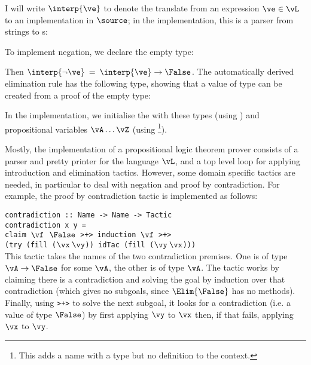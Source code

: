 I will write $\interp{\ve}$ to denote the translate from an expression
$\ve\in\vL$ to an implementation in $\source$; in the implementation,
this is a parser from strings to s:


To implement negation, we declare the empty type:

\DM{
\Data\:\False\Hab\Type\:=
}

Then $\interp{\neg\ve}\:=\:\interp{\ve}\to\False$. The automatically
derived elimination rule has the following type, showing that a value
of  type can be created from a proof of the empty type:

\DM{
\Elim{\False}\Hab\fbind{\vx}{\False}{
\fbind{\motive}{\False\to\Type}{\motive\:\vx}}
}

In the implementation, we initialise the  with these
types (using ) and propositional variables
$\vA\ldots\vZ$ (using \footnote{This adds a name with
  a type but no definition to the context.}).

Mostly, the implementation of a propositional logic theorem prover
consists of a parser and pretty printer for the language $\vL$, and a
top level loop for applying introduction and elimination
tactics. However, some domain
specific tactics are needed, in particular to deal with negation and
proof by contradiction. For example, the proof by contradiction tactic
is implemented as follows:

\texttt{contradiction :: Name -> Name -> Tactic}\\
\texttt{contradiction x y =}\\
\hspace*{0.5in}\texttt{claim $\vf$ $\False$ >+> induction $\vf$ >+>}\\
\hspace*{0.7in}\texttt{(try (fill ($\vx\:\vy$)) idTac (fill ($\vy\:\vx$)))}\\

This tactic takes the names of the two contradiction premises. One is
of type $\vA\to\False$ for some $\vA$, the other is of type
$\vA$. The tactic works by claiming there is a contradiction and
solving the goal by induction over that contradiction (which gives no
subgoals, since $\Elim{\False}$ has no methods). Finally, using
\texttt{>+>} to solve the next subgoal, it looks for a contradiction
(i.e. a value of type $\False$)
by first applying $\vy$ to $\vx$ then, if that fails, applying $\vx$
to $\vy$.

